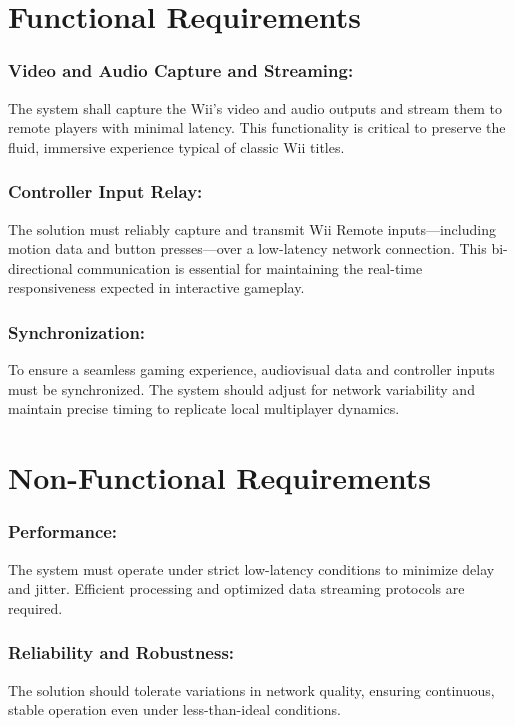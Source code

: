 \label{chapter:requirements}

\section{Functional Requirements}

\subsubsection{Video and Audio Capture and Streaming:}
	      The system shall capture the Wii’s video and audio outputs and stream them to remote players with minimal latency. This functionality is critical to preserve the fluid, immersive experience typical of classic Wii titles.

\subsubsection{Controller Input Relay:}
	      The solution must reliably capture and transmit Wii Remote inputs—including motion data and button presses—over a low-latency network connection. This bi-directional communication is essential for maintaining the real-time responsiveness expected in interactive gameplay.

\subsubsection{Synchronization:}
	      To ensure a seamless gaming experience, audiovisual data and controller inputs must be synchronized. The system should adjust for network variability and maintain precise timing to replicate local multiplayer dynamics.




\section{Non-Functional Requirements}

\subsubsection{Performance:}
	      The system must operate under strict low-latency conditions to minimize delay and jitter. Efficient processing and optimized data streaming protocols are required.

\subsubsection{Reliability and Robustness:}
	      The solution should tolerate variations in network quality, ensuring continuous, stable operation even under less-than-ideal conditions.

